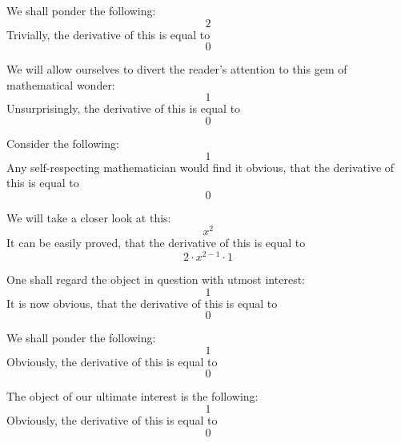\documentclass{article}
\begin{document}
We shall ponder the following:
\begin{equation}
2 
\end{equation}
Trivially, the derivative of this is equal to
\begin{equation}
0 
\end{equation}

We will allow ourselves to divert the reader's attention to this gem of mathematical wonder:
\begin{equation}
1 
\end{equation}
Unsurprisingly, the derivative of this is equal to
\begin{equation}
0 
\end{equation}

Consider the following:
\begin{equation}
1 
\end{equation}
Any self-respecting mathematician would find it obvious, that the derivative of this is equal to
\begin{equation}
0 
\end{equation}

We will take a closer look at this:
\begin{equation}
x ^{2 } 
\end{equation}
It can be easily proved, that the derivative of this is equal to
\begin{equation}
2 \cdot x ^{2 - 1 } \cdot 1 
\end{equation}

One shall regard the object in question with utmost interest:
\begin{equation}
1 
\end{equation}
It is now obvious, that the derivative of this is equal to
\begin{equation}
0 
\end{equation}

We shall ponder the following:
\begin{equation}
1 
\end{equation}
Obviously, the derivative of this is equal to
\begin{equation}
0 
\end{equation}

The object of our ultimate interest is the following:
\begin{equation}
1 
\end{equation}
Obviously, the derivative of this is equal to
\begin{equation}
0 
\end{equation}
\end{document}
